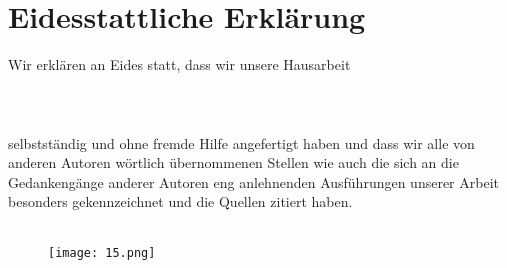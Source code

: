 
\section*{Eidesstattliche Erklärung}

Wir erklären an Eides statt, dass wir unsere Hausarbeit \\ \\
\glqq \titel \grqq{} \\ \\
selbstständig und ohne fremde Hilfe angefertigt haben und dass wir alle von anderen Autoren wörtlich übernommenen Stellen wie auch die sich an die Gedankengänge anderer Autoren eng anlehnenden Ausführungen unserer Arbeit besonders gekennzeichnet und die Quellen zitiert haben.
\\ \\

\begin{figure}[!h]
	\texttt{[image: 15.png]}
\end{figure}